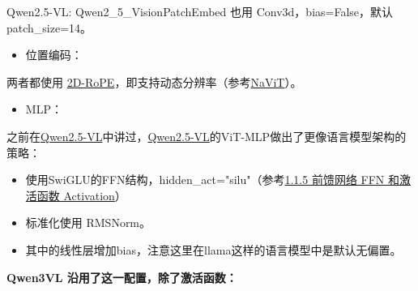 \documentclass[zihao=false,fontset=windows]{ctexart}
\newcommand{\incode}[1]{\colorbox{inlinebg}{\ttfamily\small #1}}
\begin{document}
Qwen2.5-VL: Qwen2\_5\_VisionPatchEmbed 也用 Conv3d，\textcolor{feishuRed}{bias=False}，默认 patch\_size=14。\par

\begin{itemize}[label=\textcolor{feishuBlue}{\textbullet}]
\item 位置编码：

\end{itemize}

两者都使用 \href{https://scnajei2ds6y.feishu.cn/wiki/BHUIwyfVUizmwQkKQPFceqJrnEe}{2D-RoPE}，即支持动态分辨率（参考\href{https://scnajei2ds6y.feishu.cn/wiki/N6PmwVkCcisDJGkC7Ypc1SfInwh}{NaViT}）。\par

\begin{itemize}[label=\textcolor{feishuBlue}{\textbullet}]
\item MLP：

\end{itemize}

之前在\href{https://scnajei2ds6y.feishu.cn/wiki/S7Q2wviQhiYtQFk4jKvccQwDnWe}{Qwen2.5-VL}中讲过，\href{https://scnajei2ds6y.feishu.cn/wiki/S7Q2wviQhiYtQFk4jKvccQwDnWe}{Qwen2.5-VL}的ViT-MLP做出了更像语言模型架构的策略：\par

\begin{itemize}[label=\textcolor{feishuBlue}{\textbullet}]
\item 使用SwiGLU的FFN结构，\incode{hidden\_act="silu"}（参考\href{https://swfvqxo30ma.feishu.cn/wiki/GkbjwrCJjiMiYwko5lfcM80Vnub}{1.1.5 前馈网络 FFN 和激活函数 Activation}）

\end{itemize}

\begin{itemize}[label=\textcolor{feishuBlue}{\textbullet}]
\item 标准化使用 RMSNorm。

\end{itemize}

\begin{itemize}[label=\textcolor{feishuBlue}{\textbullet}]
\item 其中的线性层增加bias，注意这里在llama这样的语言模型中是默认无偏置。

\end{itemize}

\textcolor{feishuRed}{\textbf{Qwen3VL 沿用了这一配置，除了激活函数：}}\par
\end{document}
